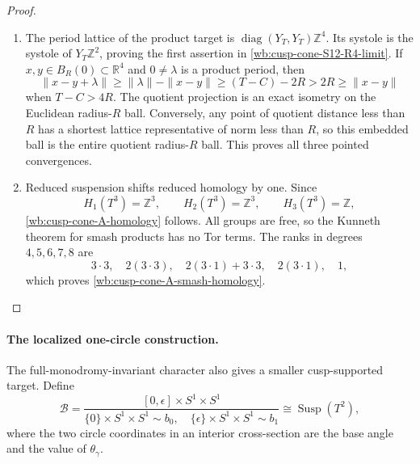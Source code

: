 \begin{proof}
\begin{enumerate}[label=\arabic*.,leftmargin=*]
\item The period lattice of the product target is
\(\operatorname{diag}(Y_T,Y_T)\mathbb Z^4\).  Its systole is the systole of
\(Y_T\mathbb Z^2\), proving the first assertion in
\cref{wb:cusp-cone-S12-R4-limit}.  If \(x,y\in B_R(0)\subset\mathbb R^4\)
and \(0\ne\lambda\) is a product period, then
\[
 \|x-y+\lambda\|\geq\|\lambda\|-\|x-y\|
 \geq(T-C)-2R>2R\geq\|x-y\|
\]
when \(T-C>4R\).  The quotient projection is an exact isometry on the
Euclidean radius-\(R\) ball.  Conversely, any point of quotient distance
less than \(R\) has a shortest lattice representative of norm less than
\(R\), so this embedded ball is the entire quotient radius-\(R\) ball.
This proves all three pointed convergences.

\item Reduced suspension shifts reduced homology by one.  Since
\[
 H_1(T^3)=\mathbb Z^3,\qquad
 H_2(T^3)=\mathbb Z^3,\qquad H_3(T^3)=\mathbb Z,
\]
\cref{wb:cusp-cone-A-homology} follows.  All groups are free, so the Kunneth
theorem for smash products has no Tor terms.  The ranks in degrees
\(4,5,6,7,8\) are
\[
 3\cdot3,\quad 2(3\cdot3),\quad
 2(3\cdot1)+3\cdot3,\quad 2(3\cdot1),\quad1,
\]
which proves \cref{wb:cusp-cone-A-smash-homology}.
\end{enumerate}
\end{proof}

\paragraph{The localized one-circle construction.}
The full-monodromy-invariant character also gives a smaller cusp-supported
target.  Define
\begin{equation}
 \mathcal B=
 \frac{[0,\epsilon]\times S^1\times S^1}
 {\{0\}\times S^1\times S^1\sim b_0,\quad
  \{\epsilon\}\times S^1\times S^1\sim b_1}
 \cong\operatorname{Susp}(T^2),
 \label{wb:cusp-cone-B-definition}
\end{equation}
where the two circle coordinates in an interior cross-section are the base
angle and the value of \(\theta_\gamma\).

